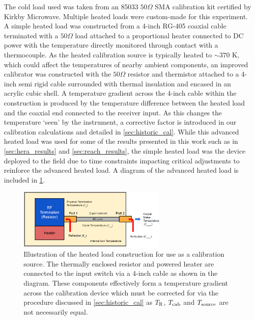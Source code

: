 The cold load used was taken from an 85033 $50 \Omega$ SMA calibration kit certified by Kirkby Microwave. Multiple heated loads were custom-made for this experiment. A simple heated load was constructed from a 4-inch RG-405 coaxial cable terminated with a $50 \Omega$ load attached to a proportional heater connected to DC power with the temperature directly monitored through contact with a thermocouple. As the heated calibration source is typically heated to $\sim 370$ K, which could affect the temperatures of nearby ambient components, an improved calibrator was constructed with the $50 \Omega$ resistor and thermistor attached to a 4-inch semi rigid cable surrounded with thermal insulation and encased in an acrylic cubic shell. A temperature gradient across the 4-inch cable within the construction is produced by the temperature difference between the heated load and the coaxial end connected to the receiver input. As this changes the temperature ‘seen’ by the instrument, a corrective factor is introduced in our calibration calculations and detailed in \cref{sec:historic_cal}. While this advanced heated load was used for some of the results presented in this work such as in \cref{sec:hera_results} and \cref{sec:reach_results}, the simple heated load was the device deployed to the field due to time constraints impacting critical adjustments to reinforce the advanced heated load. A diagram of the advanced heated load is included in \cref{fig:hot_load}.
\begin{figure}
    \centering
    \includegraphics[width=0.65\textwidth]{hot_load}
    \caption{Illustration of the heated load construction for use as a calibration source. The thermally enclosed resistor and powered heater are connected to the input switch via a 4-inch cable as shown in the diagram. These components effectively form a temperature gradient across the calibration device which must be corrected for via the procedure discussed in \cref{sec:historic_cal} as $T_{\mathrm{R}}$, $T_{\mathrm{cab}}$ and $T_{\mathrm{source}}$ are not necessarily equal.}
    \label{fig:hot_load}
\end{figure}

